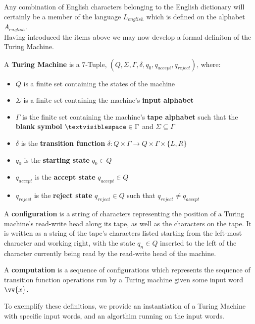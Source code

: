 \documentclass{article}
\begin{document}
\noindent Any combination of English characters belonging to the English dictionary will certainly be a member of the language $L_{english}$ which is defined on the alphabet $A_{english}$. \cite{5} \\

\noindent Having introduced the items above we may now develop a formal definiton of the Turing Machine.

\begin{defin}
	A \textbf{Turing Machine} is a 7-Tuple, $(Q, \Sigma, \Gamma, \delta, q_{0}, q_{accept}, q_{reject})$, where:
\end{defin}
\begin{itemize}
	\item $Q$ is a finite set containing the states of the machine
	\item $\Sigma$ is a finite set containing the machine's \textbf{input alphabet}
	\item $\Gamma$ is the finite set containing the machine's \textbf{tape alphabet} such that the \textbf{blank symbol} $\textvisiblespace \in \Gamma$ and $\Sigma \subseteq \Gamma$
	\item $\delta$ is the \textbf{transition function} $\delta: Q \times \Gamma \to Q \times \Gamma \times \{L, R\}$
	\item $q_{0}$ is the \textbf{starting state} $q_{0} \in Q$
	\item $q_{accept}$ is the \textbf{accept state} $q_{accept} \in Q$
	\item $q_{reject}$ is the \textbf{reject state} $q_{reject} \in Q$ such that $q_{reject} \neq q_{accept}$ \cite{2}
\end{itemize}
\begin{defin}
	A \textbf{configuration} is a string of characters representing the position of a Turing machine's read-write head along its tape, as well as the characters on the tape.  It is written as a string of the tape's characters listed starting from the left-most character and working right, with the state $q_{n} \in Q$ inserted to the left of the character currently being read by the read-write head of the machine.
\end{defin}
\begin{defin}
	A \textbf{computation} is a sequence of configurations which represents the sequence of transition function operations run by a Turing machine given some input word $\vv{x}$. \cite{6}
\end{defin}
\noindent To exemplify these definitions, we provide an instantiation of a Turing Machine with specific input words, and an algorthim running on the input words.
\end{document}

